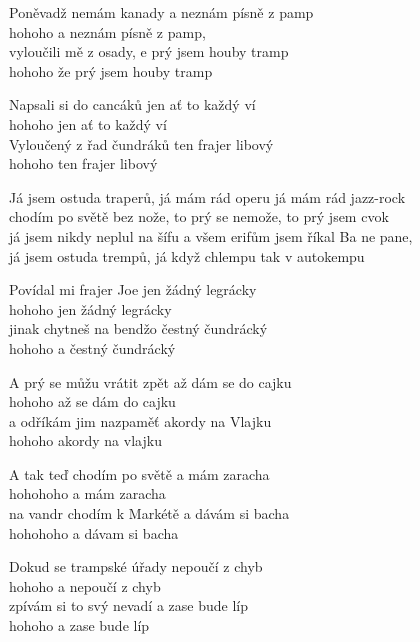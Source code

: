 \ve{}
Poněvadž nemám kanady a neznám písně z pamp\\
hohoho a neznám písně z pamp,\\
vyloučili mě z osady, e prý jsem houby tramp \\
hohoho že prý jsem houby tramp

\ve{}
Napsali si do cancáků jen ať to každý ví \\
hohoho jen ať to každý ví \\
Vyloučený z řad čundráků ten frajer libový \\
hohoho ten frajer libový

\cho{}
Já jsem ostuda traperů, já mám rád operu já mám rád jazz-rock\\
chodím po světě bez nože, to prý se nemože, to prý jsem cvok\\
já jsem nikdy neplul na šífu a všem erifům jsem říkal Ba ne pane,\\
já jsem ostuda trempů, já když chlempu tak v autokempu

\ve{}
Povídal mi frajer Joe jen žádný legrácky \\
hohoho jen žádný legrácky\\
jinak chytneš na bendžo čestný čundrácký \\
hohoho a čestný čundrácký

\ve{}
A prý se můžu vrátit zpět až dám se do cajku\\
hohoho až se dám do cajku\\
a odříkám jim nazpaměť akordy na Vlajku \\
hohoho akordy na vlajku 
\cho{}

\ve{}
A tak teď chodím po světě a mám zaracha \\
hohohoho a mám zaracha\\
na vandr chodím k Markétě a dávám si bacha\\
hohohoho a dávam si bacha 

\ve{}
Dokud se trampské úřady nepoučí z chyb \\
hohoho a nepoučí z chyb\\
zpívám si to svý nevadí a zase bude líp \\
hohoho a zase bude líp


\esong{}